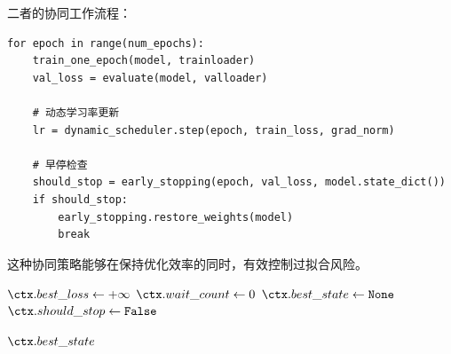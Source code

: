 \documentclass[UTF8, a4paper, 12pt]{article}
\begin{document}
二者的协同工作流程：

\begin{verbatim}
for epoch in range(num_epochs):
    train_one_epoch(model, trainloader)
    val_loss = evaluate(model, valloader)
    
    # 动态学习率更新
    lr = dynamic_scheduler.step(epoch, train_loss, grad_norm)
    
    # 早停检查
    should_stop = early_stopping(epoch, val_loss, model.state_dict())
    if should_stop:
        early_stopping.restore_weights(model)
        break
\end{verbatim}

这种协同策略能够在保持优化效率的同时，有效控制过拟合风险。

\begin{algorithm}
  \centering
  \caption{早停机制算法}
  \label{alg:early_stopping}
  \small


  \BlankLine
  $\ctx.best\_loss \leftarrow +\infty$\;
  $\ctx.wait\_count \leftarrow 0$\;
  $\ctx.best\_state \leftarrow \texttt{None}$\;
  $\ctx.should\_stop \leftarrow \texttt{False}$\;

  \BlankLine

  \Return $\ctx.best\_state$
\end{algorithm}
\end{document}
